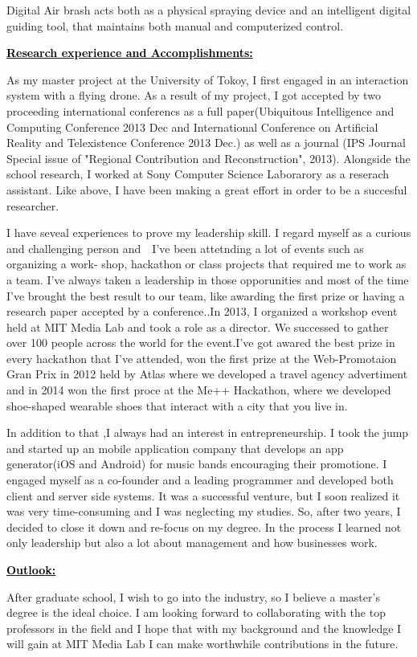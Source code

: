 \documentclass{article}
\newcommand{\statement}[1]{\par\medskip
  \underline{\textcolor{black}{\textbf{#1:}}}\space
}
\begin{document}
Digital Air brash acts both as a physical spraying device and an intelligent digital guiding tool, that maintains both manual and computerized control.


\statement{Research experience and Accomplishments}
As my master project at the University of Tokoy, I first engaged in an interaction system with a flying drone.  
As a result of my project, I got accepted by two proceeding international conferencs as a full paper(Ubiquitous Intelligence and Computing Conference 2013 Dec and International Conference on Artificial Reality and Telexistence Conference 2013 Dec.) as well as a journal (IPS Journal Special issue of "Regional Contribution and Reconstruction", 2013). Alongside the school research, I worked at Sony Computer Science Laborarory as a reserach assistant. Like above, I have been making a great effort in order to be a succesful researcher. 

I have seveal experiences to prove my leadership skill. I regard myself as a curious and challenging person and　I’ve been attetnding a lot of events such as organizing a work- shop, hackathon or class projects that required me to work as a team. I’ve always taken a leadership in those opporunities and most of the time I’ve brought the best result to our team, like awarding the first prize or having a research paper accepted by a conference..In 2013, I organized a workshop event held at MIT Media Lab and took a role as a director. We successed to gather over 100 people across the world for the event.I've got awared the best prize in every hackathon that I've attended, won the first prize at the Web-Promotaion Gran Prix in 2012 held by Atlas where we developed a travel agency advertiment and in 2014 won the first proce at the Me++ Hackathon, where we developed shoe-shaped wearable shoes that interact with a city that you live in. 

In addition to that ,I always had an interest in entrepreneurship. I took the jump and started up an mobile application company that develops an app generator(iOS and Android) for music bands encouraging their promotione. I engaged myself as a co-founder and a leading programmer and developed both client and server side systems. It was a successful venture, but I soon realized it was very time-consuming and I was neglecting my studies. So, after two years, I decided to close it down and re-focus on my degree. In the process I learned not only leadership but also a lot about management and how businesses work.


\statement{Outlook}

After graduate school, I wish to go into the industry, so I believe a master's degree is the ideal choice. I am looking forward to collaborating with the top professors in the field and I hope that with my background and the knowledge I will gain at MIT Media Lab I can make worthwhile contributions in the future.
\end{document}
